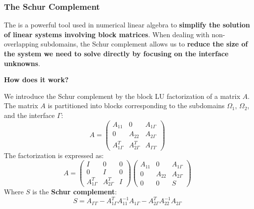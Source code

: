 \subsubsection{The Schur Complement}

The  is a powerful tool used in numerical linear algebra to \textbf{simplify the solution of linear systems involving block matrices}. When dealing with non-overlapping subdomains, the Schur complement allows us to \textbf{reduce the size of the system we need to solve directly by focusing on the interface unknowns}.

\highspace
\begin{flushleft}
    \textcolor{Green3}{ \textbf{How does it work?}}
\end{flushleft}
We introduce the Schur complement by the block LU factorization of a matrix $A$. The matrix $A$ is partitioned into blocks corresponding to the subdomains $\Omega_{1}$, $\Omega_{2}$, and the interface $\Gamma$:
\begin{equation*}
    A = \begin{pmatrix}
        A_{11}          & 0                  & A_{1\Gamma} \\
        0               & A_{22}             & A_{2\Gamma} \\
        A_{1\Gamma}^{T} & A_{2\Gamma}^{T}    & A_{\Gamma \Gamma}
    \end{pmatrix}
\end{equation*}
The factorization is expressed as:
\begin{equation*}
    A = \begin{pmatrix}
        I               & 0                 & 0 \\
        0               & I                 & 0 \\
        A_{1\Gamma}^{T} & A_{2\Gamma}^{T}   & I
    \end{pmatrix}
    \begin{pmatrix}
        A_{11}  & 0     & A_{1\Gamma} \\
        0       & A_{22}& A_{2\Gamma} \\
        0       & 0     & S
    \end{pmatrix}
\end{equation*}
Where $S$ is the \textbf{Schur complement}:
\begin{equation*}
    S = A_{\Gamma \Gamma} - A_{1\Gamma}^{T} A_{11}^{-1} A_{1\Gamma} - A_{2\Gamma}^{T} A_{22}^{-1} A_{2\Gamma}
\end{equation*}
